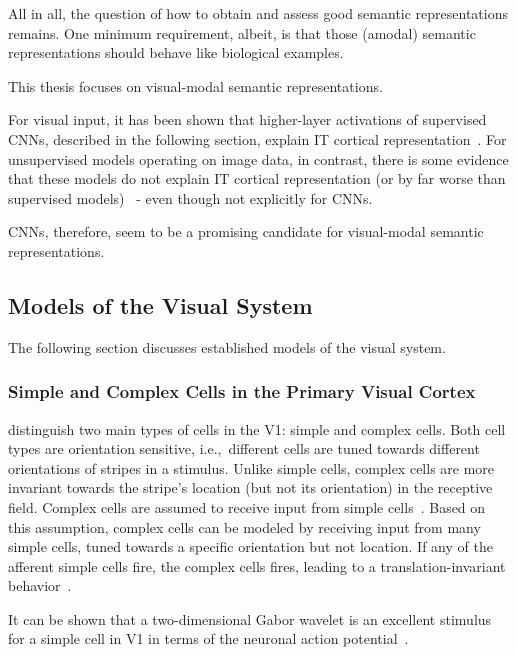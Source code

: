 All in all, the question of how to obtain and assess good semantic representations remains.
One minimum requirement, albeit, is that those (amodal) semantic representations should behave like biological examples.

This thesis focuses on visual-modal semantic representations.

For visual input, it has been shown that higher-layer activations of supervised \acp{CNN}, described in the following section, explain \ac{IT} cortical representation~\citep{khaligh2014deep,cadieu2014deep}.
For unsupervised models operating on image data, in contrast, there is some evidence that these models do not explain \ac{IT} cortical representation (or by far worse than supervised models)~\citep{khaligh2014deep} - even though not explicitly for \acp{CNN}.

\acp{CNN}, therefore, seem to be a promising candidate for visual-modal semantic representations.

\subsection{Models of the Visual System}\label{subsec:models-of-the-visual-system}

The following section discusses established models of the visual system.

\subsubsection{Simple and Complex Cells in the Primary Visual Cortex}\label{subsubseq:simple_complex_cells}

\citet{hubel1962receptive} distinguish two main types of cells in the \ac{V1}: simple and complex cells.
Both cell types are orientation sensitive, i.e.,~different cells are tuned towards different orientations of stripes in a stimulus.
Unlike simple cells, complex cells are more invariant towards the stripe's location (but not its orientation) in the receptive field.
Complex cells are assumed to receive input from simple cells~\citep{hubel1962receptive}.
Based on this assumption, complex cells can be modeled by receiving input from many simple cells, tuned towards a specific orientation but not location.
If any of the afferent simple cells fire, the complex cells fires, leading to a translation-invariant behavior~\citep{hubel1962receptive}.

It can be shown that a two-dimensional Gabor wavelet is an excellent stimulus for a simple cell in \ac{V1} in terms of the neuronal action potential~\citep{jones1987evaluation}.

